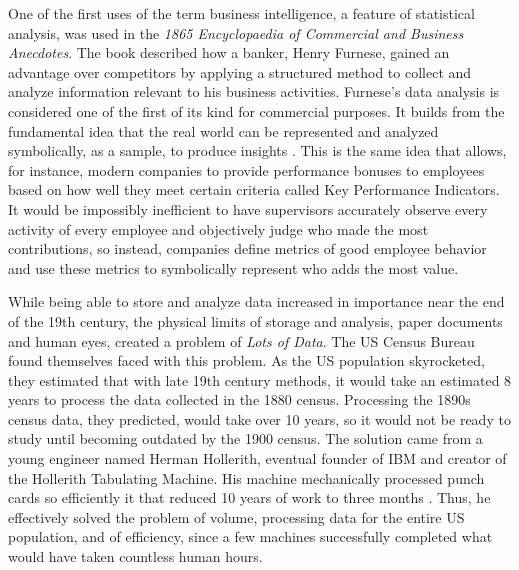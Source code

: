 \documentclass[sigconf]{acmart}
\begin{document}
	One of the first uses of the term business intelligence, a feature of statistical analysis, was used in the {\em 1865 Encyclopaedia of Commercial and Business Anecdotes}. The book described how a banker, Henry Furnese, gained an advantage over competitors by applying a structured method to collect and analyze information relevant to his business activities. Furnese's data analysis is considered one of the first of its kind for commercial purposes. It builds from the fundamental idea that the real world can be represented and analyzed symbolically, as a sample, to produce insights \cite{Data-History}. This is the same idea that allows, for instance, modern companies to provide performance bonuses to employees based on how well they meet certain criteria called Key Performance Indicators. It would be impossibly inefficient to have supervisors accurately observe every activity of every employee and objectively judge who made the most contributions, so instead, companies define metrics of good employee behavior and use these metrics to symbolically represent who adds the most value.

	While being able to store and analyze data increased in importance near the end of the 19th century, the physical limits of storage and analysis, paper documents and human eyes, created a problem of {\em Lots of Data}. The US Census Bureau found themselves faced with this problem. As the US population skyrocketed, they estimated that with late 19th century methods, it would take an estimated 8 years to process the data collected in the 1880 census. Processing the 1890s census data, they predicted, would take over 10 years, so it would not be ready to study until becoming outdated by the 1900 census. The solution came from a young engineer named Herman Hollerith, eventual founder of IBM and creator of the Hollerith Tabulating Machine. His machine mechanically processed punch cards so efficiently it that reduced 10 years of work to three months \cite{Data-History}. Thus, he effectively solved the problem of volume, processing data for the entire US population, and of efficiency, since a few machines successfully completed what would have taken countless human hours.
\end{document}
